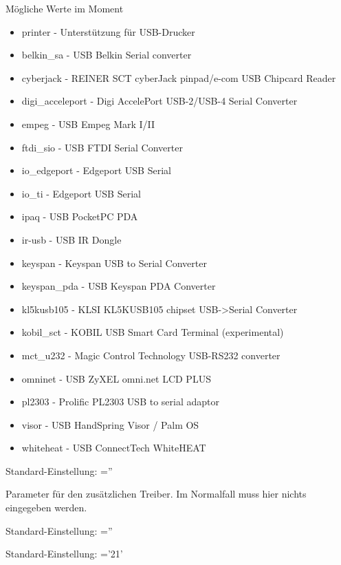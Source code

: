 \begin{description}
        Mögliche Werte im Moment
        \begin{itemize}
	    \item printer - Unterstützung für USB-Drucker
	    \item belkin\_sa - USB Belkin Serial converter
	    \item cyberjack - REINER SCT cyberJack pinpad/e-com USB Chipcard Reader
	    \item digi\_acceleport - Digi AccelePort USB-2/USB-4 Serial Converter
	    \item empeg - USB Empeg Mark I/II
	    \item ftdi\_sio - USB FTDI Serial Converter
	    \item io\_edgeport - Edgeport USB Serial
	    \item io\_ti - Edgeport USB Serial
	    \item ipaq - USB PocketPC PDA
	    \item ir-usb - USB IR Dongle
	    \item keyspan - Keyspan USB to Serial Converter
	    \item keyspan\_pda - USB Keyspan PDA Converter
	    \item kl5kusb105 - KLSI KL5KUSB105 chipset USB->Serial Converter
	    \item kobil\_sct - KOBIL USB Smart Card Terminal (experimental)
	    \item mct\_u232 - Magic Control Technology USB-RS232 converter
	    \item omninet - USB ZyXEL omni.net LCD PLUS
	    \item pl2303 - Prolific PL2303 USB to serial adaptor
	    \item visor - USB HandSpring Visor / Palm OS
	    \item whiteheat - USB ConnectTech WhiteHEAT
        \end{itemize}

        Standard-Einstellung: =''


        Parameter für den zusätzlichen Treiber. Im Normalfall muss hier
        nichts eingegeben werden.

        Standard-Einstellung: =''


        Standard-Einstellung: ='21'


\end{description}

